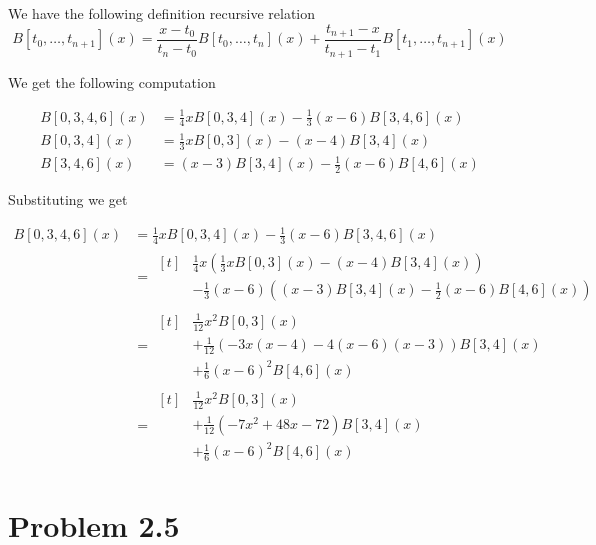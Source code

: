 \documentclass{article}
\begin{document}
We have the following definition recursive relation
\begin{equation*}
    B[t_0,\ldots, t_{n + 1}](x)
    =\frac {x - t_0}{t_n - t_0}B[t_0,\ldots,t_n](x)
    +\frac {t_{n + 1} - x}{t_{n + 1} - t_1} B[t_1,\ldots,t_{n + 1}](x)
\end{equation*}

We get the following computation

\begin{equation*}
\begin{aligned}
    B[0,3,4,6](x)
    &= \frac 1 4 x B[0,3,4](x) - \frac 1 3 (x - 6) B[3,4,6](x)\\
    B[0,3,4](x)
    &= \frac 1 3 x B[0,3](x) - (x - 4) B[3,4](x)\\
    B[3,4,6](x)
    &= (x - 3) B[3,4](x) - \frac 1 2 (x - 6) B[4,6](x)
\end{aligned}
\end{equation*}

Substituting we get

\begin{equation*}
\begin{aligned}
    B[0,3,4,6](x)
    &= \frac 1 4 x B[0,3,4](x) - \frac 1 3 (x - 6) B[3,4,6](x)\\
    &=\begin{aligned}[t]
        &\frac 1 4 x \left(\frac 1 3 x B[0,3](x) - (x - 4) B[3,4](x)\right)\\
        &- \frac 1 3 (x - 6) \left((x - 3)B[3,4](x) - \frac 1 2 (x - 6) B[4,6](x)\right)
    \end{aligned}\\
    &=\begin{aligned}[t]
        &\frac 1 {12} x^2 B[0,3](x)\\
        &+ \frac 1 {12} \left(- 3x(x - 4) - 4(x - 6)(x - 3)\right)B[3,4](x)\\
        &+ \frac 1 6 (x - 6)^2 B[4,6](x)
    \end{aligned}\\
    &=\begin{aligned}[t]
        &\frac 1 {12} x^2 B[0,3](x)\\
        &+ \frac 1 {12} \left(-7x^2 + 48x - 72\right)B[3,4](x)\\
        &+ \frac 1 6 (x - 6)^2 B[4,6](x)
    \end{aligned}
\end{aligned}
\end{equation*}

\section*{Problem 2.5}
\end{document}
